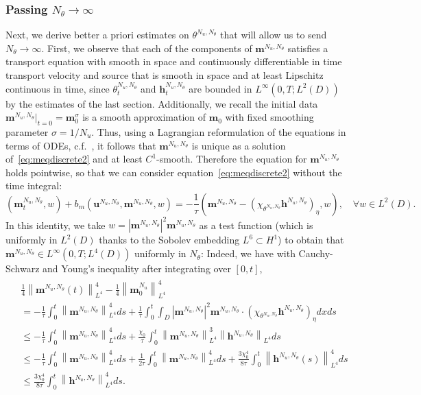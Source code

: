 \documentclass[10pt,letterpaper,twoside]{amsart}
\theoremstyle{definition}{\newtheorem{definition}[lemma]{Definition}}
\theoremstyle{note}{\newtheorem{claim}{Claim}[section]
\newtheorem*{claim*}{Claim}}
\numberwithin{equation}{section}
\newcommand{\dom}{D}
\newcommand{\norm}[1]{\left\| #1 \right\|}
\newcommand{\bm}{\mathbf{m}}
\newcommand{\bmb}{\mathbf{m}^{N_u,N_\theta}}
\newcommand{\bhb}{\mathbf{h}^{N_u,N_\theta}}
\newcommand{\bub}{\mathbf{u}^{N_u,N_\theta}}
\newcommand{\thb}{\theta^{N_u,N_\theta}}
\begin{document}
\subsubsection{Passing $N_\theta\to\infty$}
\label{sec:Nth-limit}
Next, we derive better a priori estimates on $\thb$ that will allow us to send $N_\theta\to\infty$. First, we observe that each of the components of $\bmb$ satisfies a transport equation with smooth in space and continuously differentiable in time transport velocity and source that is smooth in space and at least Lipschitz continuous in time, since $\thb_t$ and $\bhb_t$ are bounded in $L^\infty(0,T;L^2(D))$ by the estimates of the last section. Additionally, we recall the initial data $\bmb|_{t=0} = \bm^\sigma_0$ is a smooth approximation of $\bm_0$ with fixed smoothing parameter $\sigma = 1/N_u$. Thus, using a Lagrangian reformulation of the equations in terms of ODEs, c.f.~\cite{DiPernaLions1989}, it follows that $\bmb$ is unique as a solution of~\eqref{eq:meqdiscrete2} and at least $C^1$-smooth. Therefore the equation for $\bmb$ holds pointwise, so that we can consider equation~\eqref{eq:meqdiscrete2} without the time integral: 
\begin{equation}\label{eq:meqpointwise}
	(\bmb_t,w)+ b_m(\bub,\bmb,w) =-\frac{1}{\tau}(\bmb-(\chi_{\thb}\bhb)_\eta,w) , \quad \forall w\in L^2(\dom).
\end{equation}
In this identity, we take $w=|\bmb|^2\bmb $ as a test function  (which  is uniformly  in $L^2(\dom)$ thanks to the Sobolev embedding $L^6\subset H^1$) to obtain that $\bmb\in L^\infty(0,T;L^4(\dom))$ uniformly in $N_\theta$: Indeed, we have with Cauchy-Schwarz and Young's inequality after integrating over $[0,t]$,
\begin{align}\label{eq:mL4}
	\begin{split}
	&\frac14\norm{\bmb(t)}_{L^4}^4 - \frac14\norm{\bm^{N_u}_0}_{L^4}^4\\
	& = -\frac1{\tau}\int_0^t \norm{\bmb}^4_{L^4} ds + \frac1{\tau}\int_0^t \int_{\dom}|\bmb|^2 \bmb\cdot (\chi_{\thb}\bhb)_{\eta} dx ds\\
	& \leq  -\frac1{\tau}\int_0^t \norm{\bmb}^4_{L^4} ds + \frac{\chi_0}{\tau}\int_0^t \norm{\bmb}_{L^4}^3\norm{\bhb}_{L^4} ds\\
		& \leq  -\frac1{\tau}\int_0^t \norm{\bmb}^4_{L^4} ds + \frac1{2\tau}\int_0^t \norm{\bmb}_{L^4}^4 ds +\frac{3\chi_0^4}{8\tau}\int_0^t\norm{\bhb(s)}_{L^4}^4 ds\\
		&\leq \frac{3\chi_0^4}{8\tau}\int_0^t\norm{\bhb}_{L^4}^4 ds.
		\end{split}
\end{align}
\end{document}
